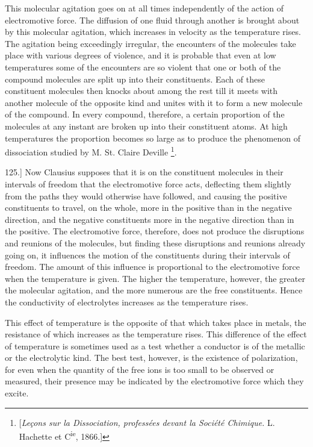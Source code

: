\documentclass[12pt,oneside]{book}[2021/10/04]
\let\oldfootnote\footnote
\renewcommand\footnote[1]{%
\oldfootnote{\hspace{0.14em}#1}}
\newcommand{\article}[1]{\phantomsection \label{art:#1}{#1.]}}
\newcommand{\¬}{\hphantom{0}}
\begin{document}
This molecular agitation goes on at all times independently of
the action of electromotive force. The diffusion of one fluid through
another is brought about by this molecular agitation, which increases
in velocity as the temperature rises. The agitation being
exceedingly irregular, the encounters of the molecules take place
with various degrees of violence, and it is probable that even at
low temperatures some of the encounters are so violent that one
or both of the compound molecules are split up into their constituents.
Each of these constituent molecules then knocks about
among the rest till it meets with another molecule of the opposite
kind and unites with it to form a new molecule of the compound.
In every compound, therefore, a certain proportion of the molecules
at any instant are broken up into their constituent atoms.
At high temperatures the proportion becomes so large as to
produce the phenomenon of dissociation studied by M. St. Claire
Deville\footnote{
[\textit{Leçons sur la Dissociation, professées devant la Société Chimique.} L. Hachette
et C\textsuperscript{ie}, 1866.]}.

\article{125} Now Clausius supposes that it is on the constituent molecules
in their intervals of freedom that the electromotive force acts,
deflecting them slightly from the paths they would otherwise have
followed, and causing the positive constituents to travel, on the
whole, more in the positive than in the negative direction, and
the negative constituents more in the negative direction than in
the positive. The electromotive force, therefore, does not produce
the disruptions and reunions of the molecules, but finding these
disruptions and reunions already going on, it influences the motion
of the constituents during their intervals of freedom. The amount
of this influence is proportional to the electromotive force when the
temperature is given. The higher the temperature, however, the
greater the molecular agitation, and the more numerous are the free
constituents. Hence the conductivity of electrolytes increases as
the temperature rises.

This effect of temperature is the opposite of that which takes
place in metals, the resistance of which increases as the temperature
rises. This difference of the effect of temperature is sometimes
used as a test whether a conductor is of the metallic or the
electrolytic kind. The best test, however, is the existence of
polarization, for even when the quantity of the free ions is too
small to be observed or measured, their presence may be indicated
by the electromotive force which they excite.
\end{document}
